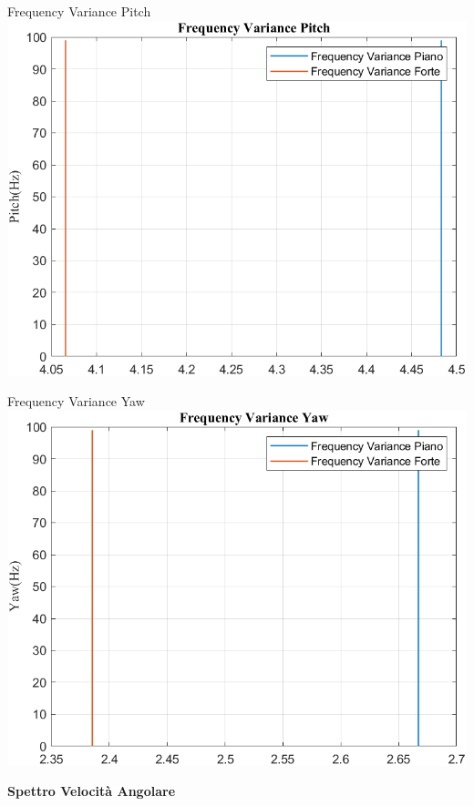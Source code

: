 \documentclass[beamer]{standalone}
\begin{document}
	\begin{frame}{{Frequency Variance Pitch}}
		\centering\includegraphics[height=.8\textheight]{figure/VAng/Trasformata/Frequency VariancePitch}
	\end{frame}
	
	\begin{frame}{{Frequency Variance Yaw}}
		\centering\includegraphics[height=.8\textheight]{figure/VAng/Trasformata/Frequency VarianceYaw}
	\end{frame}
	
	\begin{frame}
		\color{blue}\centering\huge{\textbf{Spettro Velocità Angolare}}
	\end{frame}
	
\end{document}
